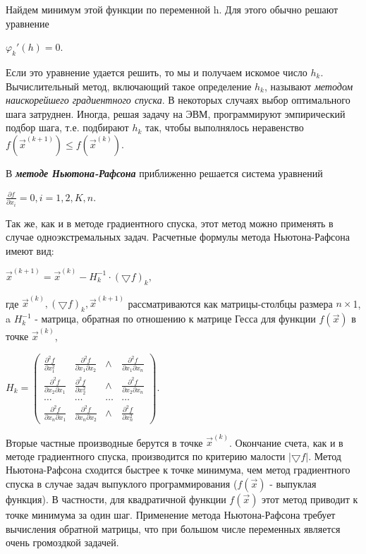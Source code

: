 {Найдем минимум этой функции по переменной h. Для этого обычно решают уравнение
\begin{center}
	${\varphi_{k}}'(h)=0.$
\end{center}

Если это уравнение удается решить, то мы и получаем искомое число $h_{k}$. Вычислительный метод,  включающий такое определение $h_{k}$, называют \textit{методом наискорейшего градиентного спуска}. В некоторых случаях выбор оптимального шага затруднен. Иногда, решая задачу на ЭВМ, программируют эмпирический подбор шага, т.е. подбирают $h_{k}$ так, чтобы выполнялось неравенство $f(\vec{x}^{(k+1)})\leq f(\vec{x}^{(k)})$.

В \textbf{\textit{методе Ньютона-Рафсона }} приближенно решается система уравнений
\begin{center}
	$\frac{\partial f}{\partial x_{i}} = 0, i=1, 2, K, n.$
\end{center}
Так же, как и в методе градиентного спуска, этот метод можно применять в случае одноэкстремальных задач. Расчетные формулы метода Ньютона-Рафсона имеют вид:

\begin{center}
	$\vec{x}^{(k+1)}=\vec{x}^{(k)}-H_{k}^{-1}\cdot (\bigtriangledown f)_{k},$
\end{center}
где $\vec{x}^{(k)}, (\bigtriangledown f)_{k},\vec{x}^{(k+1)}$ рассматриваются как матрицы-столбцы размера $n \times$1, a $H_{k}^{-1}$ - матрица, обратная по отношению к матрице Гесса для функции $f(\vec{x})$ в точке $\vec{x}^{(k)}$,
\begin{center}
	$H_{k}=\begin{pmatrix}
	\frac{\partial^{2}f}{\partial x_{1}^{2}}& \frac{\partial^{2}f}{\partial x_{1} \partial x_{2}} & \wedge  & \frac{\partial^{2}f}{\partial x_{1} \partial x_{n}}\\
	\frac{\partial^{2}f}{\partial x_{2} \partial x_{1}}& \frac{\partial^{2}f}{\partial x_{2}^{2}} & \wedge  & \frac{\partial^{2}f}{\partial x_{2} \partial x_{n}}\\
	\dots & \dots & \dots & \dots \\ 
	\frac{\partial^{2}f}{\partial x_{n} \partial x_{1}}& \frac{\partial^{2}f}{\partial x_{n} \partial x_{2}} & \wedge  & \frac{\partial^{2}f}{\partial x_{n}^{2} }
	\end{pmatrix}.$
\end{center}

Вторые частные производные берутся в точке $\vec{x}^{(k)}$. Окончание счета, как и в методе градиентного спуска, производится по критерию малости  $\left |\bigtriangledown f  \right |$. Метод Ньютона-Рафсона сходится быстрее к точке минимума, чем метод градиентного спуска в случае задач  выпуклого  программирования ($f(\vec{x})$ - выпуклая функция). В частности, для квадратичной функции  $f(\vec{x})$ этот метод приводит к точке минимума за один шаг. Применение метода Ньютона-Рафсона требует  вычисления обратной  матрицы, что при большом числе переменных является очень громоздкой задачей.

}
